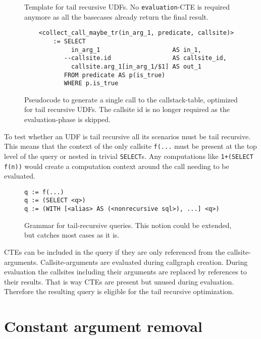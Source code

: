 \begin{figure}
    \centering
    \caption{Template for tail recursive UDFs. No \texttt{evaluation}-CTE is required anymore as all the basecases already return the final result.}
    \label{tr_opt_template}
\end{figure}


\begin{figure}[h!]\centering\small
    \begin{verbatim}
    <collect_call_maybe_tr(in_arg_1, predicate, callsite)>
        := SELECT
             in_arg_1                    AS in_1, 
           --callsite.id                 AS callsite_id,
             callsite.arg_1[in_arg_1/$1] AS out_1
           FROM predicate AS p(is_true)
           WHERE p.is_true
    \end{verbatim}
  \caption{Pseudocode to generate a single call to the callstack-table, optimized for tail recursive UDFs. The callsite id is no longer required as the evaluation-phase is skipped.}
  \label{marco:collect_call_maybe_optimized}
\end{figure}

To test whether an UDF is tail recursive all its scenarios must be tail recursive. This means that the context of the only callsite \texttt{f(...} must be present at the top level of the query or nested in trivial \texttt{SELECT}s. Any computations like \texttt{1+(SELECT f(n))} would create a computation context around the call needing to be evaluated.

\begin{figure}
    \centering
\begin{verbatim}
q := f(...)
q := (SELECT <q>)
q := (WITH [<alias> AS (<nonrecursive sql>), ...] <q>)
\end{verbatim}
    \caption{Grammar for tail-recursive queries. This notion could be extended, but catches most cases as it is.}
    \label{tr_grammar}
\end{figure}

CTEs can be included in the query if they are only referenced from the callsite-arguments. Callsite-arguments are evaluated during callgraph creation. During evaluation the callsites including their arguments are replaced by references to their results. That is way CTEs are present but unused during evaluation. Therefore the resulting query is eligible for the tail recursive optimization.

\section{Constant argument removal}

